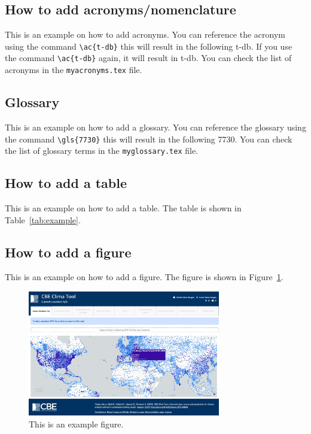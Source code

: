 \subsection{How to add acronyms/nomenclature}\label{subsec:how-to-add-acronyms}
This is an example on how to add acronyms.
You can reference the acronym using the command \verb!\ac{t-db}! this will result in the following \ac{t-db}.
If you use the command \verb!\ac{t-db}! again, it will result in \ac{t-db}.
You can check the list of acronyms in the \texttt{myacronyms.tex} file.

\subsection{Glossary}\label{subsec:glossary}

This is an example on how to add a glossary.
You can reference the glossary using the command \verb!\gls{7730}! this will result in the following \gls{7730}.
You can check the list of glossary terms in the \texttt{myglossary.tex} file.

\subsection{How to add a table}\label{subsec:how-to-add-a-table}
This is an example on how to add a table.
The table is shown in Table~\ref{tab:example}.



\subsection{How to add a figure}\label{subsec:how-to-add-a-figure}
This is an example on how to add a figure.
The figure is shown in Figure~\ref{fig:example}.

\begin{figure}[htb!]
    \centering
    \includegraphics[width=0.75\textwidth]{figures/example_clima}
    \caption{This is an example figure.}
    \label{fig:example}
\end{figure}

